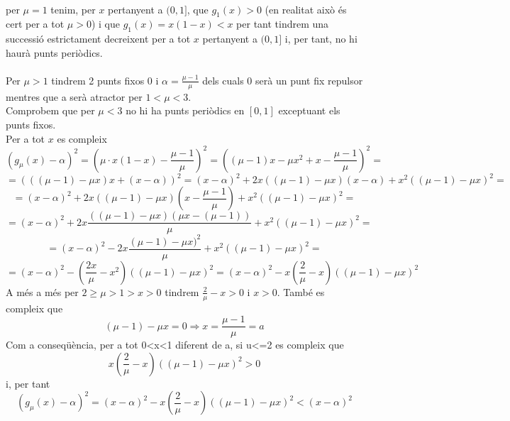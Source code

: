 \documentclass[a4paper,10pt]{article}
\renewcommand{\*}{\cdot}
\renewcommand{\a}{\alpha}
\renewcommand{\u}{\mu}
\begin{document}
\phantom{.}\\
per $\mu=1$ tenim, per $x$ pertanyent a $(0,1]$, que $g_1(x)>0$ (en realitat això és cert per a tot $\mu>0$) i que
$g_1(x)=x(1-x)<x$ per tant tindrem una successió estrictament decreixent per a tot $x$ pertanyent a $(0,1]$ i, per tant, no hi haurà punts periòdics.\\
\phantom{.}\\
Per $\mu>1$ tindrem 2 punts fixos 0 i $\a=\frac{\u-1}{\u}$ dels cuals 0 serà un punt fix repulsor mentres que a serà atractor per $1<\u<3$.\\
Comprobem que per $\u<3$ no hi ha punts periòdics en $[0,1]$ exceptuant els punts fixos.\\
Per a tot $x$ es compleix
\begin{equation*}
(g_{\u}(x)-\a)^2=\left(\u\*x(1-x)-\frac{\u-1}{\u}\right)^2=
\left((\u-1)x-\u x^2+x-\frac{\u-1}{\u}\right)^2=
\end{equation*}
\begin{equation*}
=(((\u-1)-\u x)x+(x-\a))^2
=(x-\a)^2+2x((\u-1)-\u x)(x-\a)+x^2((\u-1)-\u x)^2=
\end{equation*}
\begin{equation*}
=(x-\a)^2+2x((\u-1)-\u x)(x-\frac{\u-1}{\u})+x^2((\u-1)-\u x)^2=
\end{equation*}
\begin{equation*}
=(x-\a)^2+2x\frac{((\u-1)-\u x)(\u x-(\u-1))}{\u}+x^2((\u-1)-\u x)^2=
\end{equation*}
\begin{equation*}
=(x-\a)^2-2x\frac{(\u-1)-\u x)^2}{\u}+x^2((\u-1)-\u x)^2=
\end{equation*}
\begin{equation*}
=(x-\a)^2-\left(\frac{2x}{\u}-x^2\right)((\u-1)-\u x)^2=(x-\a)^2-x\left(\frac{2}{\u}-x\right)((\u-1)-\u x)^2
\end{equation*}
A més a més per $2\ge\u>1>x>0$ tindrem $\frac{2}{\u}-x>0$ i $x>0$. També es compleix que
\begin{equation*}
(\u-1)-\u x=0  \Rightarrow x=\frac{\u-1}{\u}=a 
\end{equation*}
Com a conseqüència, per a tot 0<x<1 diferent de a, si u<=2 es compleix que
\begin{equation*}
x\left(\frac{2}{\u}-x\right)((\u-1)-\u x)^2>0
\end{equation*}
i, per tant
\begin{equation*}
(g_{\u}(x)-\a)^2=(x-\a)^2-x\left(\frac{2}{\u}-x\right)((\u-1)-\u x)^2<(x-\a)^2
\end{equation*}
\end{document}
